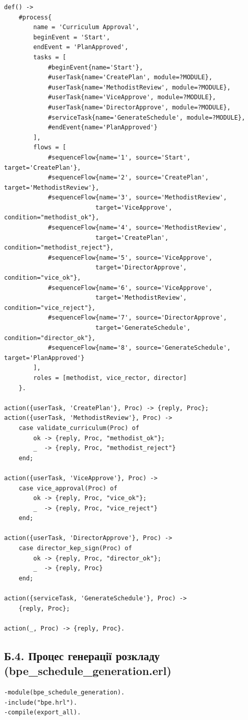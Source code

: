 \documentclass{article}
\begin{document}
\begin{appendix}
\begin{verbatim}
def() ->
    #process{
        name = 'Curriculum Approval',
        beginEvent = 'Start',
        endEvent = 'PlanApproved',
        tasks = [
            #beginEvent{name='Start'},
            #userTask{name='CreatePlan', module=?MODULE},
            #userTask{name='MethodistReview', module=?MODULE},
            #userTask{name='ViceApprove', module=?MODULE},
            #userTask{name='DirectorApprove', module=?MODULE},
            #serviceTask{name='GenerateSchedule', module=?MODULE},
            #endEvent{name='PlanApproved'}
        ],
        flows = [
            #sequenceFlow{name='1', source='Start', target='CreatePlan'},
            #sequenceFlow{name='2', source='CreatePlan', target='MethodistReview'},
            #sequenceFlow{name='3', source='MethodistReview', 
                         target='ViceApprove', condition="methodist_ok"},
            #sequenceFlow{name='4', source='MethodistReview', 
                         target='CreatePlan', condition="methodist_reject"},
            #sequenceFlow{name='5', source='ViceApprove', 
                         target='DirectorApprove', condition="vice_ok"},
            #sequenceFlow{name='6', source='ViceApprove', 
                         target='MethodistReview', condition="vice_reject"},
            #sequenceFlow{name='7', source='DirectorApprove', 
                         target='GenerateSchedule', condition="director_ok"},
            #sequenceFlow{name='8', source='GenerateSchedule', target='PlanApproved'}
        ],
        roles = [methodist, vice_rector, director]
    }.

action({userTask, 'CreatePlan'}, Proc) -> {reply, Proc};
action({userTask, 'MethodistReview'}, Proc) ->
    case validate_curriculum(Proc) of
        ok -> {reply, Proc, "methodist_ok"};
        _  -> {reply, Proc, "methodist_reject"}
    end;

action({userTask, 'ViceApprove'}, Proc) ->
    case vice_approval(Proc) of
        ok -> {reply, Proc, "vice_ok"};
        _  -> {reply, Proc, "vice_reject"}
    end;

action({userTask, 'DirectorApprove'}, Proc) ->
    case director_kep_sign(Proc) of
        ok -> {reply, Proc, "director_ok"};
        _  -> {reply, Proc}
    end;

action({serviceTask, 'GenerateSchedule'}, Proc) ->
    {reply, Proc};

action(_, Proc) -> {reply, Proc}.
\end{verbatim}

\subsection{Б.4. Процес генерації розкладу (bpe\_schedule\_generation.erl)}
\begin{verbatim}
-module(bpe_schedule_generation).
-include("bpe.hrl").
-compile(export_all).


\end{verbatim}
\end{appendix}
\end{document}
